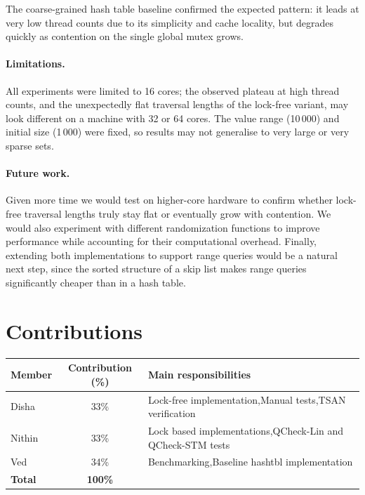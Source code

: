 \documentclass[11pt,a4paper]{article}
\begin{document}
The coarse-grained hash table baseline confirmed the expected pattern: it leads
at very low thread counts due to its simplicity and cache locality, but
degrades quickly as contention on the single global mutex grows.

\paragraph{Limitations.}
All experiments were limited to 16 cores; the observed plateau at high thread
counts, and the unexpectedly flat traversal lengths of the lock-free variant,
may look different on a machine with 32 or 64 cores. The value range (10\,000)
and initial size (1\,000) were fixed, so results may not generalise to very
large or very sparse sets.

\paragraph{Future work.}
Given more time we would test on higher-core hardware to confirm whether
lock-free traversal lengths truly stay flat or eventually grow with contention.
We would also experiment with different randomization functions to improve performance while accounting for their computational overhead. Finally, extending both implementations to support
range queries would be a natural next step, since the sorted structure of a
skip list makes range queries significantly cheaper than in a hash table.

\section*{Contributions}
\label{sec:contributions}


\begin{center}
\begin{tabular}{@{}lcl@{}}
\toprule
\textbf{Member} & \textbf{Contribution (\%)} & \textbf{Main responsibilities} \\
\midrule
Disha & 33\% & Lock-free implementation,Manual tests,TSAN verification \\
Nithin   & 33\% & Lock based implementations,QCheck-Lin and QCheck-STM tests \\
Ved & 34\% &  Benchmarking,Baseline hashtbl implementation \\
\midrule
\textbf{Total} & \textbf{100\%} & \\
\bottomrule
\end{tabular}
\end{center}





\end{document}
